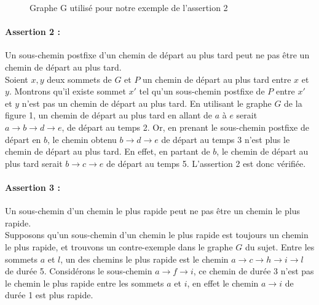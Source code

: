 \documentclass{article}
\begin{document}
\begin{figure}[h]
    \centering
    \caption{Graphe G utilisé pour notre exemple de l'assertion 2}
\end{figure}

\paragraph{Assertion 2 : } Un sous-chemin postfixe d'un chemin de départ au plus
tard peut ne pas être un chemin de départ au plus tard. \\
Soient $x, y$ deux sommets de $G$ et $P$ un chemin de départ au plus tard entre
$x$ et $y$. Montrons qu'il existe sommet $x'$ tel qu'un sous-chemin postfixe de
$P$ entre $x'$ et $y$ n'est pas un chemin de départ au plus tard. En utilisant
le graphe $G$ de la figure 1, un chemin de départ au plus tard en allant de $a$ à
$e$ serait $a \rightarrow b \rightarrow d \rightarrow e$, de départ au temps 2.
Or, en prenant le sous-chemin postfixe de départ en $b$, le chemin obtenu $b
\rightarrow d \rightarrow e $ de départ au temps 3 n'est plus le chemin de
départ au plus tard. En effet, en partant de $b$, le chemin de départ au plus
tard serait $b \rightarrow c \rightarrow e$ de départ au temps 5. L'assertion 2
est donc vérifiée.

\paragraph{Assertion 3 : } Un sous-chemin d'un chemin le plus rapide peut ne pas
être un chemin le plus rapide. \\
Supposons qu'un sous-chemin d'un chemin le plus rapide est toujours un chemin le
plus rapide, et trouvons un contre-exemple dans le graphe $G$ du sujet. Entre
les sommets $a$ et $l$, un des chemins le plus rapide est le chemin $a
\rightarrow c \rightarrow h \rightarrow i \rightarrow l$ de durée 5. Considérons
le sous-chemin $a \rightarrow f \rightarrow i$, ce chemin de durée $3$ n'est pas
le chemin le plus rapide entre les sommets $a$ et $i$, en effet le chemin $a
\rightarrow i$ de durée 1 est plus rapide.
\end{document}
